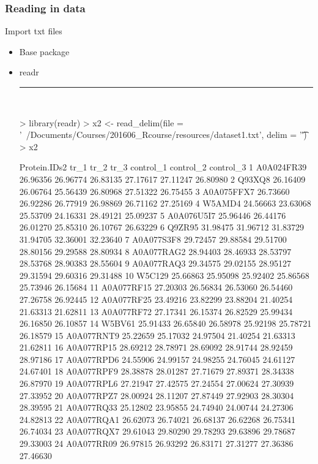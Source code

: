 \documentclass{beamer}
\begin{document}
\begin{frame}[fragile]
	\frametitle{Reading in data}
	\centering \Large Import txt files
	\begin{itemize}
		\small
		\item Base package
		\item readr
\rule{\textwidth}{0.4pt}\\
\tiny
\setlength{\fancyvrbtopsep}{-1pt}
\setlength{\fancyvrbpartopsep}{-1pt}
\begin{Schunk}
\begin{Sinput}
> library(readr)
> x2 <- read_delim(file = '~/Documents/Courses/201606_Rcourse/resources/dataset1.txt', delim = '\t')
> x2
\end{Sinput}
\begin{Soutput}
   Protein.IDs2     tr_1     tr_2     tr_3 control_1 control_2 control_3
1    A0A024FR39 26.96356 26.96774 26.83135  27.17617  27.11247  26.80980
2        Q93XQ8 26.16409 26.06764 25.56439  26.80968  27.51322  26.75455
3    A0A075FFX7 26.73660 26.92286 26.77919  26.98869  26.71162  27.25169
4        W5AMD4 24.56663 23.63068 25.53709  24.16331  28.49121  25.09237
5    A0A076U5I7 25.96446 26.44176 26.01270  25.85310  26.10767  26.63229
6        Q9ZR95 31.98475 31.96712 31.83729  31.94705  32.36001  32.23640
7    A0A077S3F8 29.72457 29.88584 29.51700  28.80156  29.29588  28.80934
8    A0A077RAG2 28.94403 28.46933 28.53797  28.53768  28.90383  28.55604
9    A0A077RAQ3 29.34575 29.02155 28.95127  29.31594  29.60316  29.31488
10       W5C129 25.66863 25.95098 25.92402  25.86568  25.73946  26.15684
11   A0A077RF15 27.20303 26.56834 26.53060  26.54460  27.26758  26.92445
12   A0A077RF25 23.49216 23.82299 23.88204  21.40254  21.63313  21.62811
13   A0A077RF72 27.17341 26.15374 26.82529  25.99434  26.16850  26.10857
14       W5BV61 25.91433 26.65840 26.58978  25.92198  25.78721  26.18579
15   A0A077RNT9 25.22659 25.17032 24.97504  21.40254  21.63313  21.62811
16   A0A077RP15 28.69212 28.78971 28.69092  28.91744  28.92459  28.97186
17   A0A077RPD6 24.55906 24.99157 24.98255  24.76045  24.61127  24.67401
18   A0A077RPF9 28.38878 28.01287 27.71679  27.89371  28.34338  26.87970
19   A0A077RPL6 27.21947 27.42575 27.24554  27.00624  27.30939  27.33952
20   A0A077RPZ7 28.00924 28.11207 27.87449  27.92903  28.30304  28.39595
21   A0A077RQ33 25.12802 23.95855 24.74940  24.00744  24.27306  24.82813
22   A0A077RQA1 26.62073 26.74021 26.68137  26.62268  26.75341  26.74034
23   A0A077RQX7 29.61043 29.80290 29.78293  29.63896  29.78687  29.33003
24   A0A077RR09 26.97815 26.93292 26.83171  27.31277  27.36386  27.46630

\end{Soutput}
\end{Schunk}
\end{itemize}
\end{frame}
\end{document}
